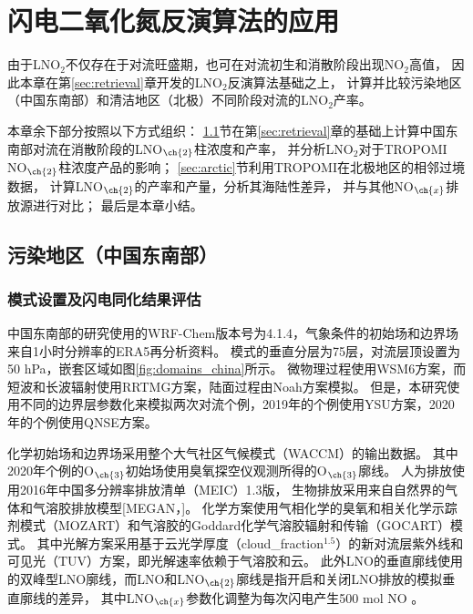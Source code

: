 
\chapter{闪电二氧化氮反演算法的应用} \label{chapter:PE}

由于LNO$_2$不仅存在于对流旺盛期，也可在对流初生和消散阶段出现NO$_2$高值，
因此本章在第\ref{sec:retrieval}章开发的LNO$_2$反演算法基础之上，
计算并比较污染地区（中国东南部）和清洁地区（北极）不同阶段对流的LNO$_2$产率。

本章余下部分按照以下方式组织：
\ref{sec:china}节在第\ref{sec:retrieval}章的基础上计算中国东南部对流在消散阶段的LNO$_{\ch{2}}$柱浓度和产率，
并分析LNO$_2$对于TROPOMI NO$_{\ch{2}}$柱浓度产品的影响；
\ref{sec:arctic}节利用TROPOMI在北极地区的相邻过境数据，
计算LNO$_{\ch{2}}$的产率和产量，分析其海陆性差异，
并与其他NO$_{\ch{x}}$排放源进行对比；
最后是本章小结。


\section{污染地区（中国东南部）} \label{sec:china}

\subsection{模式设置及闪电同化结果评估} \label{sec:model_settings_china}

中国东南部的研究使用的WRF-Chem版本号为4.1.4，气象条件的初始场和边界场来自1小时分辨率的ERA5再分析资料。
模式的垂直分层为75层，对流层顶设置为50 hPa，嵌套区域如图\ref{fig:domains_china}所示。
微物理过程使用WSM6方案\citep{Hong.2006a}，而短波和长波辐射使用RRTMG方案\citep{Iacono.2008}，陆面过程由Noah方案模拟\citep{Koren.1999}。
但是，本研究使用不同的边界层参数化来模拟两次对流个例，2019年的个例使用YSU方案\citep{Hong.2006}，2020年的个例使用QNSE方案\citep{Sukoriansky.2005}。

化学初始场和边界场采用整个大气社区气候模式（WACCM）的输出数据。
其中2020年个例的O$_{\ch{3}}$初始场使用臭氧探空仪观测所得的O$_{\ch{3}}$廓线。
人为排放使用2016年中国多分辨率排放清单（MEIC）1.3版，
生物排放采用来自自然界的气体和气溶胶排放模型[MEGAN，\citet{Guenther.2006}]。
化学方案使用气相化学的臭氧和相关化学示踪剂模式（MOZART）和气溶胶的Goddard化学气溶胶辐射和传输（GOCART）模式\citep{Pfister.2011}。
其中光解方案采用基于云光学厚度（cloud\_fraction$^{1.5}$）的新对流层紫外线和可见光（TUV）方案，即光解速率依赖于气溶胶和云。
此外LNO的垂直廓线使用\citet{Ott.2010}的双峰型LNO廓线\citep{Laughner.2017}，而LNO和LNO$_{\ch{2}}$廓线是指开启和关闭LNO排放的模拟垂直廓线的差异，
其中LNO$_{\ch{x}}$参数化调整为每次闪电产生500 mol NO \citep{Zhu.2019}。


